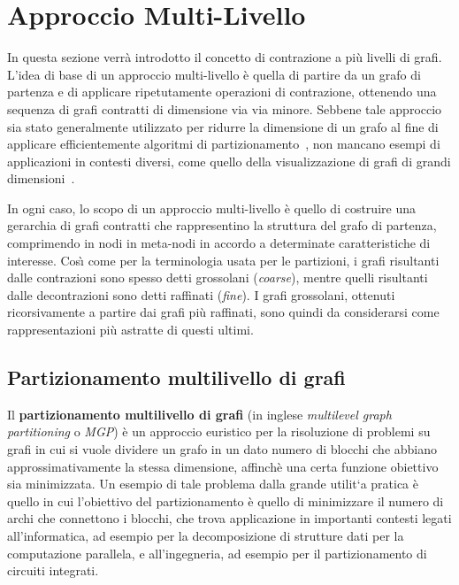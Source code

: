 \section{Approccio Multi-Livello}\label{sec:approccio-multi-livello}
In questa sezione verr\`a introdotto il concetto di contrazione a pi\`u livelli di grafi. \newline
L'idea di base di un approccio multi-livello \`e quella di partire da un grafo di partenza e di applicare
ripetutamente operazioni di contrazione, ottenendo una sequenza di grafi contratti di dimensione via via minore.
Sebbene tale approccio sia stato generalmente utilizzato per ridurre la dimensione di un grafo al fine di
applicare efficientemente algoritmi di partizionamento~\cite{DBLP:journals/corr/abs-1012-0006},
non mancano esempi di applicazioni in contesti diversi, come quello della visualizzazione di grafi di grandi
dimensioni~\cite{4069239}. \newline

In ogni caso, lo scopo di un approccio multi-livello \`e quello di costruire una gerarchia di grafi contratti
che rappresentino la struttura del grafo di partenza, comprimendo in nodi in meta-nodi in accordo a determinate
caratteristiche di interesse.
Cos\`{\i} come per la terminologia usata per le partizioni, i grafi risultanti dalle contrazioni sono spesso detti
grossolani (\textit{coarse}), mentre quelli risultanti dalle decontrazioni sono detti raffinati (\textit{fine}).
I grafi grossolani, ottenuti ricorsivamente a partire dai grafi pi\`u raffinati, sono quindi da considerarsi
come rappresentazioni pi\`u astratte di questi ultimi. \newline

\subsection{Partizionamento multilivello di grafi}\label{subsec:partizionamento-multilivello-di-grafi}
Il \textbf{partizionamento multilivello di grafi} (in inglese \textit{multilevel graph partitioning} o \textit{MGP})
\`e un approccio euristico per la risoluzione di problemi su grafi in cui si vuole dividere un grafo in un dato numero
di blocchi che abbiano approssimativamente la stessa dimensione, affinch\`e una certa funzione obiettivo sia
minimizzata. \newline
Un esempio di tale problema dalla grande utilit`a pratica \`e quello in cui l'obiettivo del partizionamento \`e quello
di minimizzare il numero di archi che connettono i blocchi, che trova applicazione in importanti contesti legati
all'informatica, ad esempio per la decomposizione di strutture dati per la computazione parallela, e all'ingegneria,
ad esempio per il partizionamento di circuiti integrati. \newline


